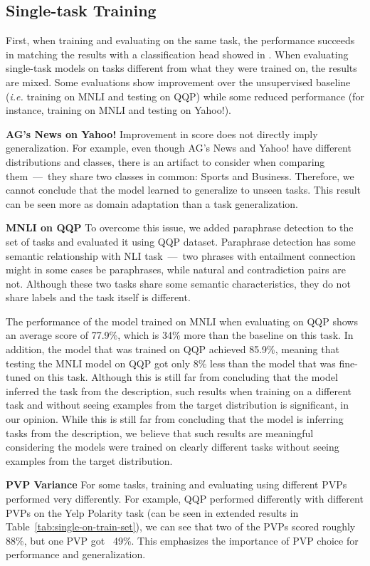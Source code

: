 \documentclass[11pt,a4paper]{article}
\newcommand{\subtitle}[1]{\vspace{5pt}\noindent\textbf{#1}\quad}
\begin{document}
\subsection{Single-task Training}
First, when training and evaluating on the same task, the performance succeeds in matching the results with a classification head showed in \citet{schick2020exploiting}.
When evaluating single-task models on tasks different from what they were trained on, the results are mixed.
Some evaluations show improvement over the unsupervised baseline (\textit{i.e.} training on MNLI and testing on QQP)
while some reduced performance (for instance, training on MNLI and testing on Yahoo!).

\subtitle{AG's News on Yahoo!}
Improvement in score does not directly imply generalization.
For example, even though AG's News and Yahoo! have different distributions and classes, there is an artifact to consider when comparing them~---~they share two classes in common: Sports and Business.
Therefore, we cannot conclude that the model learned to generalize to unseen tasks.
This result can be seen more as domain adaptation than a task generalization.

\subtitle{MNLI on QQP}
To overcome this issue, we added paraphrase detection to the set of tasks and evaluated it using QQP dataset.
Paraphrase detection has some semantic relationship with NLI task~---~two phrases with entailment connection might in some cases be paraphrases, while natural and contradiction pairs are not.
Although these two tasks share some semantic characteristics, they do not share labels and the task itself is different.

The performance of the model trained on MNLI when evaluating on QQP shows an average score of 77.9\%,
which is 34\% more than the baseline on this task.
In addition, the model that was trained on QQP achieved 85.9\%,
meaning that testing the MNLI model on QQP got only 8\% less than the model that was fine-tuned on this task.
Although this is still far from concluding that the model inferred the task from the description,
such results when training on a different task and without seeing examples from the target distribution is significant, in our opinion.
While this is still far from concluding that the model is inferring tasks from the description, we believe that such results are meaningful considering the models were trained on clearly different tasks without seeing examples from the target distribution.

\subtitle{PVP Variance}
For some tasks, training and evaluating using different PVPs performed very differently.
For example, QQP performed differently with different PVPs on the Yelp Polarity task (can be seen in extended results in Table~\ref{tab:single-on-train-set}), we can see that two of the PVPs scored roughly 88\%, but one PVP got ~49\%.
This emphasizes the importance of PVP choice for performance and generalization.
\end{document}
